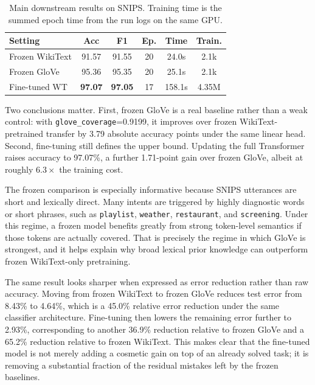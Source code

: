 \documentclass[10pt,a4paper]{article}
\begin{document}
\begin{table}[htbp]
\centering
\caption{Main downstream results on SNIPS. Training time is the summed epoch time from the run logs on the same GPU.}
\label{tab:transfer_results}
\small
\renewcommand{\arraystretch}{1.05}
\begin{tabular}{@{}lccccc@{}}
\toprule
\textbf{Setting} & \textbf{Acc} & \textbf{F1} & \textbf{Ep.} & \textbf{Time} & \textbf{Train.} \\
\midrule
Frozen WikiText & 91.57 & 91.55 & 20 & 24.0s & 2.1k \\
Frozen GloVe    & 95.36 & 95.35 & 20 & 25.1s & 2.1k \\
Fine-tuned WT   & \textbf{97.07} & \textbf{97.05} & 17 & 158.1s & 4.35M \\
\bottomrule
\end{tabular}
\end{table}

Two conclusions matter. First, frozen GloVe is a real baseline rather than a weak control: with \texttt{glove\_coverage}=0.9199, it improves over frozen WikiText-pretrained transfer by 3.79 absolute accuracy points under the same linear head. Second, fine-tuning still defines the upper bound. Updating the full Transformer raises accuracy to 97.07\%, a further 1.71-point gain over frozen GloVe, albeit at roughly $6.3\times$ the training cost.

The frozen comparison is especially informative because SNIPS utterances are short and lexically direct. Many intents are triggered by highly diagnostic words or short phrases, such as \texttt{playlist}, \texttt{weather}, \texttt{restaurant}, and \texttt{screening}. Under this regime, a frozen model benefits greatly from strong token-level semantics if those tokens are actually covered. That is precisely the regime in which GloVe is strongest, and it helps explain why broad lexical prior knowledge can outperform frozen WikiText-only pretraining.

The same result looks sharper when expressed as error reduction rather than raw accuracy. Moving from frozen WikiText to frozen GloVe reduces test error from 8.43\% to 4.64\%, which is a 45.0\% relative error reduction under the same classifier architecture. Fine-tuning then lowers the remaining error further to 2.93\%, corresponding to another 36.9\% reduction relative to frozen GloVe and a 65.2\% reduction relative to frozen WikiText. This makes clear that the fine-tuned model is not merely adding a cosmetic gain on top of an already solved task; it is removing a substantial fraction of the residual mistakes left by the frozen baselines.
\end{document}
